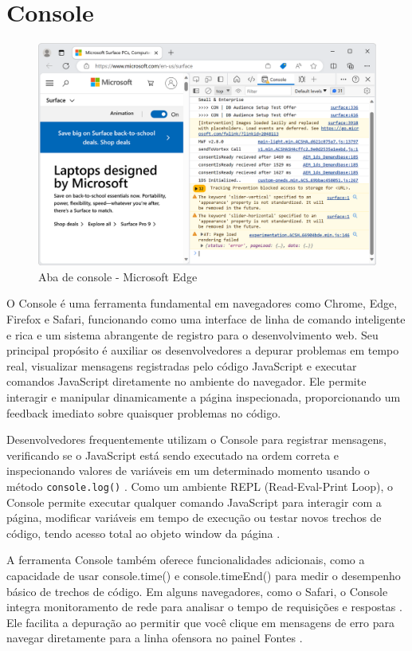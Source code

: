\section{Console}
\begin{figure}[h!]
    \centering
    \includegraphics[width=0.7\linewidth]{assets/tools/edge-console.png}
    \caption{Aba de console - Microsoft Edge }
    \label{fig:enter-label}
\end{figure}
O Console é uma ferramenta fundamental em navegadores como Chrome, Edge, Firefox e Safari, funcionando como uma interface de linha de comando inteligente e rica e um sistema abrangente de registro para o desenvolvimento web. Seu principal propósito é auxiliar os desenvolvedores a depurar problemas em tempo real, visualizar mensagens registradas pelo código JavaScript e executar comandos JavaScript diretamente no ambiente do navegador\cite{chrome}. Ele permite interagir e manipular dinamicamente a página inspecionada, proporcionando um feedback imediato sobre quaisquer problemas no código.

Desenvolvedores frequentemente utilizam o Console para registrar mensagens, verificando se o JavaScript está sendo executado na ordem correta e inspecionando valores de variáveis em um determinado momento usando o método \texttt{console.log()} \cite{chrome}. Como um ambiente REPL (Read-Eval-Print Loop), o Console permite executar qualquer comando JavaScript para interagir com a página, modificar variáveis em tempo de execução ou testar novos trechos de código, tendo acesso total ao objeto window da página \cite{apple}.

A ferramenta Console também oferece funcionalidades adicionais, como a capacidade de usar console.time() e console.timeEnd() para medir o desempenho básico de trechos de código. Em alguns navegadores, como o Safari, o Console integra monitoramento de rede para analisar o tempo de requisições e respostas \cite{apple}. Ele facilita a depuração ao permitir que você clique em mensagens de erro para navegar diretamente para a linha ofensora no painel Fontes \cite{apple}. 

